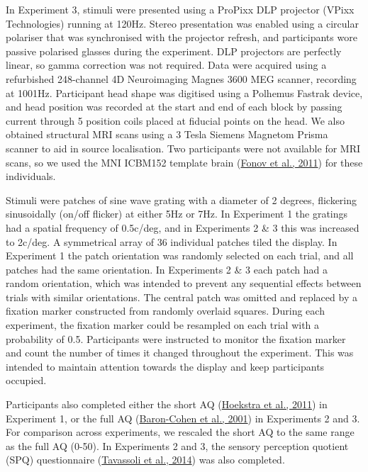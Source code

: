\documentclass[
]{article}
\begin{document}
In Experiment 3, stimuli were presented using a ProPixx DLP projector (VPixx Technologies) running at 120Hz. Stereo presentation was enabled using a circular polariser that was synchronised with the projector refresh, and participants wore passive polarised glasses during the experiment. DLP projectors are perfectly linear, so gamma correction was not required. Data were acquired using a refurbished 248-channel 4D Neuroimaging Magnes 3600 MEG scanner, recording at 1001Hz. Participant head shape was digitised using a Polhemus Fastrak device, and head position was recorded at the start and end of each block by passing current through 5 position coils placed at fiducial points on the head. We also obtained structural MRI scans using a 3 Tesla Siemens Magnetom Prisma scanner to aid in source localisation. Two participants were not available for MRI scans, so we used the MNI ICBM152 template brain (\protect\hyperlink{ref-Fonov2011}{Fonov et al., 2011}) for these individuals.

Stimuli were patches of sine wave grating with a diameter of 2 degrees, flickering sinusoidally (on/off flicker) at either 5Hz or 7Hz. In Experiment 1 the gratings had a spatial frequency of 0.5c/deg, and in Experiments 2 \& 3 this was increased to 2c/deg. A symmetrical array of 36 individual patches tiled the display. In Experiment 1 the patch orientation was randomly selected on each trial, and all patches had the same orientation. In Experiments 2 \& 3 each patch had a random orientation, which was intended to prevent any sequential effects between trials with similar orientations. The central patch was omitted and replaced by a fixation marker constructed from randomly overlaid squares. During each experiment, the fixation marker could be resampled on each trial with a probability of 0.5. Participants were instructed to monitor the fixation marker and count the number of times it changed throughout the experiment. This was intended to maintain attention towards the display and keep participants occupied.

Participants also completed either the short AQ (\protect\hyperlink{ref-Hoekstra2011}{Hoekstra et al., 2011}) in Experiment 1, or the full AQ (\protect\hyperlink{ref-Baron-Cohen2001}{Baron-Cohen et al., 2001}) in Experiments 2 and 3. For comparison across experiments, we rescaled the short AQ to the same range as the full AQ (0-50). In Experiments 2 and 3, the sensory perception quotient (SPQ) questionnaire (\protect\hyperlink{ref-Tavassoli2014}{Tavassoli et al., 2014}) was also completed.
\end{document}
